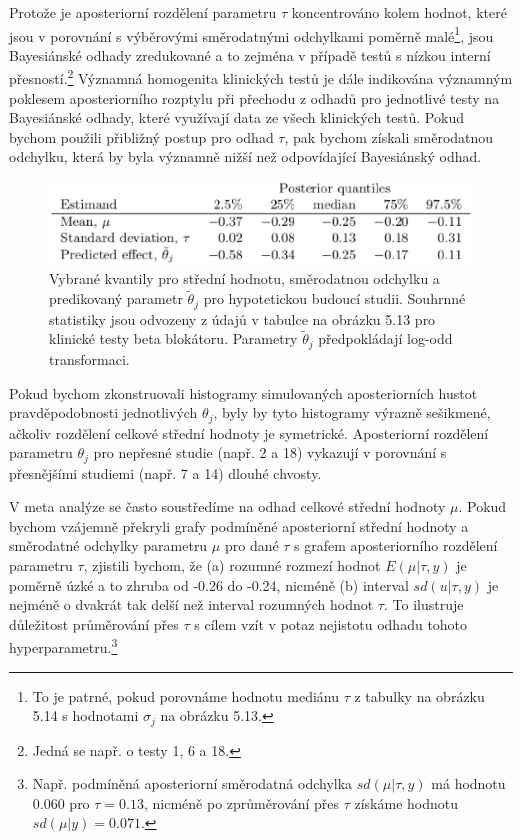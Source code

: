 Protože je aposteriorní rozdělení parametru $\tau$ koncentrováno kolem hodnot, které jsou v porovnání s výběrovými směrodatnými odchylkami poměrně malé\footnote{To je patrné, pokud porovnáme hodnotu mediánu $\tau$ z tabulky na obrázku 5.14 s hodnotami $\sigma_j$ na obrázku 5.13.}, jsou Bayesiánské odhady zredukované a to zejména v případě testů s nízkou interní přesností.\footnote{Jedná se např. o testy 1, 6 a 18.} Významná homogenita klinických testů je dále indikována významným poklesem aposteriorního rozptylu při přechodu z odhadů pro jednotlivé testy na Bayesiánské odhady, které využívají data ze všech klinických testů. Pokud bychom použili přibližný postup pro odhad $\tau$, pak bychom získali směrodatnou odchylku, která by byla významně nižší než odpovídající Bayesiánský odhad.
\begin{figure}[htp]
\centering
\includegraphics[scale = 0.45]{pictures/tbl_5_6.eps}
\caption{Vybrané kvantily pro střední hodnotu, směrodatnou odchylku a predikovaný parametr $\tilde{\theta}_j$ pro hypotetickou budoucí studii. Souhrnné statistiky jsou odvozeny z údajů v tabulce na obrázku 5.13 pro klinické testy beta blokátoru. Parametry $\tilde{\theta}_j$ předpokládají log-odd transformaci.}
\label{tbl_5_6}
\end{figure}

Pokud bychom zkonstruovali histogramy simulovaných aposteriorních hustot pravděpodobnosti jednotlivých $\theta_j$, byly by tyto histogramy výrazně sešikmené, ačkoliv rozdělení celkové střední hodnoty je symetrické. Aposteriorní rozdělení parametru $\theta_j$ pro nepřesné studie (např. 2 a 18) vykazují v porovnání s přesnějšími studiemi (např. 7 a 14) dlouhé chvosty.

V meta analýze se často soustředíme na odhad celkové střední hodnoty $\mu$. Pokud bychom vzájemně překryli grafy podmíněné aposteriorní střední hodnoty a směrodatné odchylky parametru $\mu$ pro dané $\tau$ s grafem aposteriorního rozdělení parametru $\tau$, zjistili bychom, že (a) rozumné rozmezí hodnot $E(\mu | \tau, y)$ je poměrně úzké a to zhruba od -0.26 do -0.24, nicméně (b) interval $sd(u | \tau, y)$ je nejméně o dvakrát tak delší než interval rozumných hodnot $\tau$. To ilustruje důležitost průměrování přes $\tau$ s cílem vzít v potaz nejistotu odhadu tohoto hyperparametru.\footnote{Např. podmíněná aposteriorní směrodatná odchylka $sd(\mu | \tau, y)$ má hodnotu 0.060 pro $\tau = 0.13$, nicméně po zprůměrování přes $\tau$ získáme hodnotu $sd(\mu|y) = 0.071$.}

